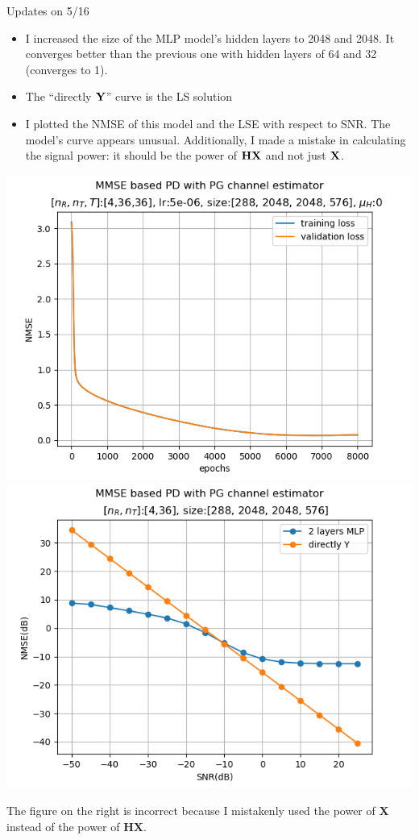 \documentclass[hyperref={bookmarks=false}]{beamer}
\numberwithin{figure}{section}
\begin{document}
\begin{frame}[allowframebreaks]{Updates on 5/16}
\begin{itemize}
  \item I increased the size of the MLP model's hidden layers to 2048 and 2048.
      It converges better than the previous one with hidden layers of 64 and 32 (converges to 1).
  \item The ``directly ${\bf Y}$'' curve is the LS solution
  \item I plotted the NMSE of this model and the LSE with respect to SNR. The model's
      curve appears unusual. Additionally, I made a mistake in calculating the signal power: 
      it should be the power of ${\bf H}{\bf X}$ and not just ${\bf X}$.
\end{itemize}

\begin{center}
  \includegraphics[width=0.45\linewidth]{figures/240516/N_lr5e-06_[288, 2048, 2048, 576]_ep8000_mu0.png}
  \includegraphics[width=0.45\linewidth]{figures/240516/mlp[2048,2048]withY_snr[-50,25].png}
\end{center}
The figure on the right is incorrect because I mistakenly used the power of $\mathbf{X}$ instead of the 
power of $\mathbf{HX}$.

\end{frame}
\end{document}
